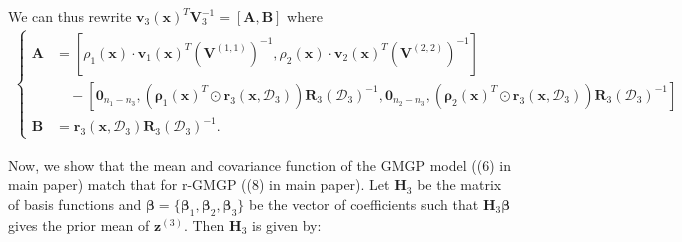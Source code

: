 \documentclass[12pt]{article}
\newcommand{\bs}[1]{\boldsymbol{#1}}
\begin{document}
We can thus rewrite $\bs{v}_3(\bs{x})^T\bs{V}_3^{-1} = \left[\bs{A}, \bs{B}\right]$ where
\begin{align*}
\begin{cases}
    \bs{A} &= \left[\rho_1(\bs{x})\cdot \bs{v}_1(\bs{x})^T(\bs{V}^{(1,1)})^{-1},\rho_2(\bs{x})\cdot \bs{v}_2(\bs{x})^T(\bs{V}^{(2,2)})^{-1}\right]\\ 
    &\quad - \left[\bs{0}_{n_1-n_3}, (\bs{\rho}_1(\bs{x})^T\odot \bs{r}_3(\bs{x},\mathcal{D}_3))\bs{R}_3(\mathcal{D}_3)^{-1},\bs{0}_{n_2-n_3}, (\bs{\rho}_2(\bs{x})^T\odot \bs{r}_3(\bs{x},\mathcal{D}_3))\bs{R}_3(\mathcal{D}_3)^{-1}\right]\\
    \bs{B} &= \bs{r}_3(\bs{x},\mathcal{D}_3)\bs{R}_3(\mathcal{D}_3)^{-1}.
\end{cases}
\end{align*}

Now, we show that the mean and covariance function of the GMGP model ((6) in main paper) match that for r-GMGP ((8) in main paper). Let $\bs{H}_3$ be the matrix of basis functions and $\bs{\beta}=\{\bs{\beta}_1,\bs{\beta}_2,\bs{\beta}_3\}$ be the vector of coefficients such that $\bs{H}_3\bs{\beta}$ gives the prior mean of $\bs{z}^{(3)}$. Then $\bs{H}_3$ is given by:
\end{document}
